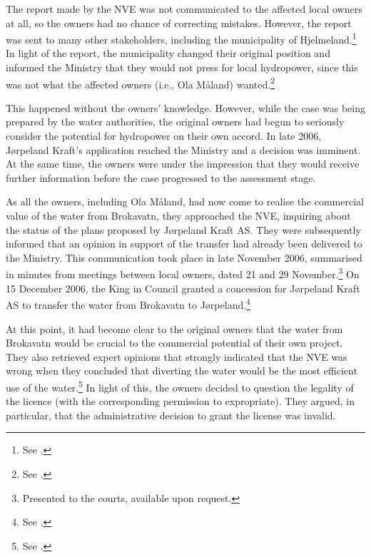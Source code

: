 The report made by the NVE was not communicated to the affected local owners at all, so the owners had no chance of correcting mistakes. However, the report was sent to many other stakeholders, including the municipality of Hjelmeland.\footnote{See \cite[24]{jorpeland09}.} In light of the report, the municipality changed their original position and informed the Ministry that they would not press for local hydropower, since this was not what the affected owners (i.e., Ola Måland) wanted.\footnote{See \cite[24]{jorpeland09}.}

This happened without the owners' knowledge. However, while the case was being prepared by the water authorities, the original owners had begun to seriously consider the potential for hydropower on their own accord. In late 2006, Jørpeland Kraft's application reached the Ministry and a decision was imminent. At the same time, the owners were under the impression that they would receive further information before the case progressed to the assessment stage.

As all the owners, including Ola Måland, had now come to realise the commercial value of the water from Brokavatn, they approached the NVE, inquiring about the status of the plans proposed by Jørpeland Kraft AS. They were subsequently informed that an opinion in support of the transfer had already been delivered to the Ministry. This communication took place in late November 2006, summarised in minutes from meetings between local owners, dated 21 and 29 November.\footnote{Presented to the courts, available upon request.} On 15 December 2006, the King in Council granted a concession for Jørpeland Kraft AS to transfer the water from Brokavatn to Jørpeland.\footnote{See \cite[3]{jorpeland09}.}

At this point, it had become clear to the original owners that the water from Brokavatn would be crucial to the commercial potential of their own project. They also retrieved expert opinions that strongly indicated that the NVE was wrong when they concluded that diverting the water would be the most efficient use of the water.\footnote{See \cite[23]{jorpeland09}.} In light of this, the owners decided to question the legality of the licence (with the corresponding permission to expropriate). They argued, in particular, that the administrative decision to grant the license was invalid.

